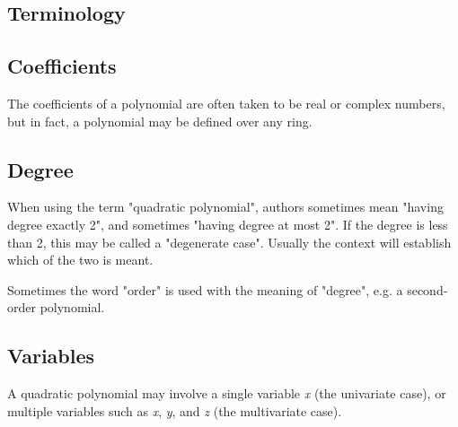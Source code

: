 \subsection{Terminology}
\label{sss:term-40dc}





\subsection{Coefficients}
\label{sss:coef-f6ff}




The coefficients of a polynomial are often taken to be real or complex numbers, but in
fact, a polynomial may be defined over any ring.




\subsection{Degree}
\label{sss:degr-fb81}




When using the term "quadratic polynomial", authors sometimes mean "having degree exactly
2", and sometimes "having degree at most 2". If the degree is less than 2, this may be
called a "degenerate case". Usually the context will establish which of the two is meant.



Sometimes the word "order" is used with the meaning of "degree", e.g. a second-order polynomial.




\subsection{Variables}
\label{sss:vari-87cd}




A quadratic polynomial may involve a single variable \textit{x} (the univariate case), or
multiple variables such as \textit{x}, \textit{y}, and \textit{z} (the multivariate case).




